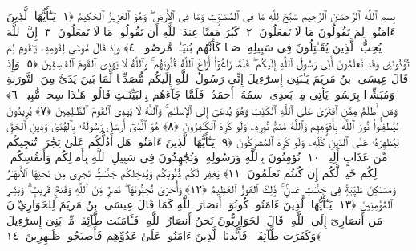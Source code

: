 
  
    
  
    
    

\nopagebreak
  بِسمِ ٱللَّهِ ٱلرَّحمَـٰنِ ٱلرَّحِيمِ
  سَبَّحَ لِلَّهِ مَا فِى ٱلسَّمَـٰوَٟتِ وَمَا فِى ٱلأَرضِ ۖ وَهُوَ ٱلعَزِيزُ ٱلحَكِيمُ ﴿١﴾
 يَـٰٓأَيُّهَا ٱلَّذِينَ ءَامَنُوا۟ لِمَ تَقُولُونَ مَا لَا تَفعَلُونَ ﴿٢﴾
 كَبُرَ مَقتًا عِندَ ٱللَّهِ أَن تَقُولُوا۟ مَا لَا تَفعَلُونَ ﴿٣﴾
 إِنَّ ٱللَّهَ يُحِبُّ ٱلَّذِينَ يُقَـٰتِلُونَ فِى سَبِيلِهِۦ صَفًّۭا كَأَنَّهُم بُنيَـٰنٌۭ مَّرصُوصٌۭ ﴿٤﴾
 وَإِذ قَالَ مُوسَىٰ لِقَومِهِۦ يَـٰقَومِ لِمَ تُؤذُونَنِى وَقَد تَّعلَمُونَ أَنِّى رَسُولُ ٱللَّهِ إِلَيكُم ۖ فَلَمَّا زَاغُوٓا۟ أَزَاغَ ٱللَّهُ قُلُوبَهُم ۚ وَٱللَّهُ لَا يَهدِى ٱلقَومَ ٱلفَـٰسِقِينَ ﴿٥﴾
 وَإِذ قَالَ عِيسَى ٱبنُ مَريَمَ يَـٰبَنِىٓ إِسرَٰٓءِيلَ إِنِّى رَسُولُ ٱللَّهِ إِلَيكُم مُّصَدِّقًۭا لِّمَا بَينَ يَدَىَّ مِنَ ٱلتَّورَىٰةِ وَمُبَشِّرًۢا بِرَسُولٍۢ يَأتِى مِنۢ بَعدِى ٱسمُهُۥٓ أَحمَدُ ۖ فَلَمَّا جَآءَهُم بِٱلبَيِّنَـٰتِ قَالُوا۟ هَـٰذَا سِحرٌۭ مُّبِينٌۭ ﴿٦﴾
 وَمَن أَظلَمُ مِمَّنِ ٱفتَرَىٰ عَلَى ٱللَّهِ ٱلكَذِبَ وَهُوَ يُدعَىٰٓ إِلَى ٱلإِسلَـٰمِ ۚ وَٱللَّهُ لَا يَهدِى ٱلقَومَ ٱلظَّـٰلِمِينَ ﴿٧﴾
 يُرِيدُونَ لِيُطفِـُٔوا۟ نُورَ ٱللَّهِ بِأَفوَٟهِهِم وَٱللَّهُ مُتِمُّ نُورِهِۦ وَلَو كَرِهَ ٱلكَـٰفِرُونَ ﴿٨﴾
 هُوَ ٱلَّذِىٓ أَرسَلَ رَسُولَهُۥ بِٱلهُدَىٰ وَدِينِ ٱلحَقِّ لِيُظهِرَهُۥ عَلَى ٱلدِّينِ كُلِّهِۦ وَلَو كَرِهَ ٱلمُشرِكُونَ ﴿٩﴾
 يَـٰٓأَيُّهَا ٱلَّذِينَ ءَامَنُوا۟ هَل أَدُلُّكُم عَلَىٰ تِجَٰرَةٍۢ تُنجِيكُم مِّن عَذَابٍ أَلِيمٍۢ ﴿١٠﴾
 تُؤمِنُونَ بِٱللَّهِ وَرَسُولِهِۦ وَتُجَٰهِدُونَ فِى سَبِيلِ ٱللَّهِ بِأَموَٟلِكُم وَأَنفُسِكُم ۚ ذَٟلِكُم خَيرٌۭ لَّكُم إِن كُنتُم تَعلَمُونَ ﴿١١﴾
 يَغفِر لَكُم ذُنُوبَكُم وَيُدخِلكُم جَنَّـٰتٍۢ تَجرِى مِن تَحتِهَا ٱلأَنهَـٰرُ وَمَسَـٰكِنَ طَيِّبَةًۭ فِى جَنَّـٰتِ عَدنٍۢ ۚ ذَٟلِكَ ٱلفَوزُ ٱلعَظِيمُ ﴿١٢﴾
 وَأُخرَىٰ تُحِبُّونَهَا ۖ نَصرٌۭ مِّنَ ٱللَّهِ وَفَتحٌۭ قَرِيبٌۭ ۗ وَبَشِّرِ ٱلمُؤمِنِينَ ﴿١٣﴾
 يَـٰٓأَيُّهَا ٱلَّذِينَ ءَامَنُوا۟ كُونُوٓا۟ أَنصَارَ ٱللَّهِ كَمَا قَالَ عِيسَى ٱبنُ مَريَمَ لِلحَوَارِيِّۦنَ مَن أَنصَارِىٓ إِلَى ٱللَّهِ ۖ قَالَ ٱلحَوَارِيُّونَ نَحنُ أَنصَارُ ٱللَّهِ ۖ فَـَٔامَنَت طَّآئِفَةٌۭ مِّنۢ بَنِىٓ إِسرَٰٓءِيلَ وَكَفَرَت طَّآئِفَةٌۭ ۖ فَأَيَّدنَا ٱلَّذِينَ ءَامَنُوا۟ عَلَىٰ عَدُوِّهِم فَأَصبَحُوا۟ ظَـٰهِرِينَ ﴿١٤﴾
 
